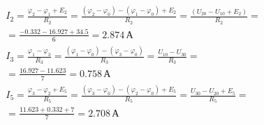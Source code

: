 \begin{enumerate}
	      \[
		      \begin{gathered}
			      I_2 = \frac{\varphi_2 - \varphi_1 + E_2}{R_2} = \frac{(\varphi_2 -\varphi_0) - (\varphi_1 - \varphi_0) + E_2}{R_2} = \frac{(U_{20}-U_{10}+E_2)}{R_2} = \\
			      = \frac{-0.332-16.927+34.5}{6} = 2.874 \, \text{А} \\
			      I_3 = \frac{\varphi_1 - \varphi_3}{R_3} = \frac{(\varphi_1 -\varphi_0) - (\varphi_3 - \varphi_0)}{R_3} = \frac{U_{10}-U_{30}}{R_3} = \\
			      = \frac{16.927-11.623}{7} = 0.758 \, \text{А} \\
			      I_5 = \frac{\varphi_3-\varphi_2+E_5}{R_5} = \frac{(\varphi_3-\varphi_0)-(\varphi_2-\varphi_0)+E_5}{R_5} = \frac{U_{30}-U_{20}+E_5}{R_5} = \\
			      = \frac{11.623+0.332+7}{7} = 2.708 \, \text{А} \\
		      \end{gathered}
	      \]
\end{enumerate}
